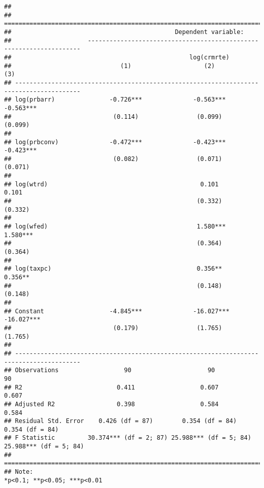 \documentclass[]{article}
\begin{document}
\begin{verbatim}
## 
## ========================================================================================
##                                             Dependent variable:                         
##                     --------------------------------------------------------------------
##                                                 log(crmrte)                             
##                              (1)                    (2)                    (3)          
## ----------------------------------------------------------------------------------------
## log(prbarr)               -0.726***              -0.563***              -0.563***       
##                            (0.114)                (0.099)                (0.099)        
##                                                                                         
## log(prbconv)              -0.472***              -0.423***              -0.423***       
##                            (0.082)                (0.071)                (0.071)        
##                                                                                         
## log(wtrd)                                          0.101                  0.101         
##                                                   (0.332)                (0.332)        
##                                                                                         
## log(wfed)                                         1.580***               1.580***       
##                                                   (0.364)                (0.364)        
##                                                                                         
## log(taxpc)                                        0.356**                0.356**        
##                                                   (0.148)                (0.148)        
##                                                                                         
## Constant                  -4.845***              -16.027***             -16.027***      
##                            (0.179)                (1.765)                (1.765)        
##                                                                                         
## ----------------------------------------------------------------------------------------
## Observations                  90                     90                     90          
## R2                          0.411                  0.607                  0.607         
## Adjusted R2                 0.398                  0.584                  0.584         
## Residual Std. Error    0.426 (df = 87)        0.354 (df = 84)        0.354 (df = 84)    
## F Statistic         30.374*** (df = 2; 87) 25.988*** (df = 5; 84) 25.988*** (df = 5; 84)
## ========================================================================================
## Note:                                                        *p<0.1; **p<0.05; ***p<0.01
\end{verbatim}
\end{document}
